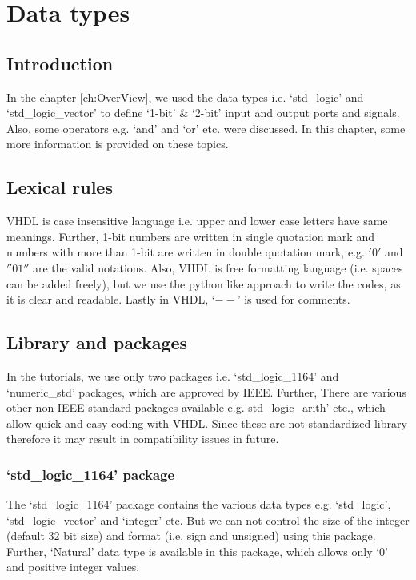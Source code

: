 \chapter{Data types} \label{ch:Datatypes}

\graphicspath{{Chapters/Datatypes/Figures/}}

%
\section{Introduction}

In the chapter \ref{ch:OverView}, we used the data-types i.e. `std\_logic' and `std\_logic\_vector' to define `1-bit' $\&$ `2-bit' input and output ports and signals. Also, some operators e.g. `and' and `or' etc. were discussed. In this chapter, some more information is provided on these topics.

\section{Lexical rules}
VHDL is case insensitive language i.e. upper and lower case letters have same meanings. Further, 1-bit numbers are written in single quotation mark and numbers with more than 1-bit are written in double quotation mark, e.g. $'0'$ and $''01''$ are the valid notations. Also, VHDL is free formatting language (i.e. spaces can be added freely), but we use the python like approach to write the codes, as it is clear and readable. Lastly in VHDL, `$--$' is used for comments. 

\section{Library and packages}\label{sec:libPack}
In the tutorials, we use only two packages i.e. `std\_logic\_1164' and `numeric\_std' packages, which are approved by IEEE. Further, There are various other non-IEEE-standard packages available e.g. std\_logic\_arith' etc., which allow quick and easy coding with VHDL. Since these are not standardized library therefore it may result in compatibility issues in future. 

\subsection{`std\_logic\_1164' package}
The `std\_logic\_1164' package contains the various data types e.g. `std\_logic', `std\_logic\_vector' and `integer' etc. But we can not control the size of the integer (default 32 bit size) and format (i.e. sign and unsigned) using this package. Further,  `Natural' data type is available in this package, which allows only `0' and positive integer values.

